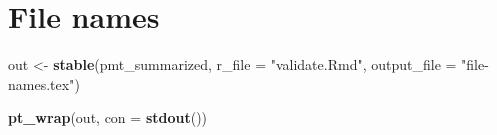 \documentclass[
]{article}
\newenvironment{Shaded}{\begin{snugshade}}{\end{snugshade}}
\newcommand{\ControlFlowTok}[1]{\textcolor[rgb]{0.13,0.29,0.53}{\textbf{#1}}}
\newcommand{\DataTypeTok}[1]{\textcolor[rgb]{0.13,0.29,0.53}{#1}}
\newcommand{\KeywordTok}[1]{\textcolor[rgb]{0.13,0.29,0.53}{\textbf{#1}}}
\newcommand{\NormalTok}[1]{#1}
\newcommand{\OperatorTok}[1]{\textcolor[rgb]{0.81,0.36,0.00}{\textbf{#1}}}
\newcommand{\StringTok}[1]{\textcolor[rgb]{0.31,0.60,0.02}{#1}}
\begin{document}
\begin{Shaded}
\end{Shaded}

\clearpage

\hypertarget{file-names}{%
\section{File names}\label{file-names}}

\begin{Shaded}
\begin{Highlighting}[]
\NormalTok{out <-}\StringTok{ }\KeywordTok{stable}\NormalTok{(pmt_summarized, }\DataTypeTok{r_file =} \StringTok{"validate.Rmd"}\NormalTok{, }\DataTypeTok{output_file =} \StringTok{"file-names.tex"}\NormalTok{)}

\KeywordTok{pt_wrap}\NormalTok{(out, }\DataTypeTok{con =} \KeywordTok{stdout}\NormalTok{()) }
\end{Highlighting}
\end{Shaded}
\end{document}
